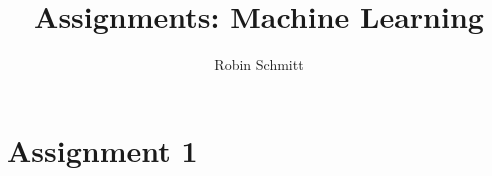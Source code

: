 \documentclass{article}
\title{Assignments: Machine Learning}
\author{Robin Schmitt}
\begin{document}
\maketitle

\tableofcontents

\section{Assignment 1}
\end{document}
